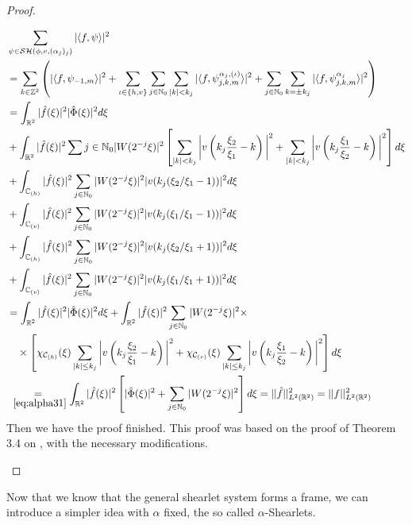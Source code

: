 \begin{proof}
\begin{itemize}
$$
\begin{aligned}
&\sum_{\psi\in\mathcal{SH}(\phi,v,(\alpha_j)_j)}|\langle f,\psi\rangle |^2\\
&=\sum_{k\in\mathbb{Z}^2}\left( |\langle f,\psi_{-1,m}\rangle|^2+\sum_{\iota\in\{h,v\}}\sum_{j\in\mathbb{N}_0}\sum_{|k|<k_j}|\langle f,\psi_{j,k,m}^{\alpha_j,(\iota)}\rangle|^2+\sum_{j\in\mathbb{N}_0}\sum_{k=\pm k_j}|\langle f,\psi_{j,k,m}^{\alpha_j}\rangle |^2 \right)\\
&=\int_{\mathbb{R}^2}|\hat{f}(\xi)|^2|\hat{\Phi}(\xi)|^2d\xi\\
&+\int_{\mathbb{R}^2}|\hat{f}(\xi)|^2\sum{j\in\mathbb{N}_0}|W(2^{-j}\xi)|^2\left[ \sum_{|k|<k_j}\bigg| v\left( k_j\frac{\xi_2}{\xi_1}-k\right)\bigg|^2+\sum_{|k|<k_j}\bigg| v\left(k_j\frac{\xi_1}{\xi_2}-k\right)\bigg|^2\right] d\xi\\
&+\int_{\mathbb{C}_{(h)}}|\hat{f}(\xi)|^2\sum_{j\in\mathbb{N}_0}|W(2^{-j}\xi)|^2|v(k_j(\xi_2/\xi_1-1))|^2d\xi\\
&+\int_{\mathbb{C}_{(v)}}|\hat{f}(\xi)|^2\sum_{j\in\mathbb{N}_0}|W(2^{-j}\xi)|^2|v(k_j(\xi_1/\xi_1-1))|^2d\xi\\
&+\int_{\mathbb{C}_{(h)}}|\hat{f}(\xi)|^2\sum_{j\in\mathbb{N}_0}|W(2^{-j}\xi)|^2|v(k_j(\xi_2/\xi_1+1))|^2d\xi\\
&+\int_{\mathbb{C}_{(v)}}|\hat{f}(\xi)|^2\sum_{j\in\mathbb{N}_0}|W(2^{-j}\xi)|^2|v(k_j(\xi_1/\xi_1+1))|^2d\xi\\
&=\int_{\mathbb{R}^2}|\hat{f}(\xi)|^2|\hat{\Phi}(\xi)|^2d\xi+\int_{\mathbb{R}^2}|\hat{f}(\xi)|^2\sum_{j\in\mathbb{N}_0}|W(2^{-j}\xi)|^2\times \\
&\quad \times \left[ \chi_{\mathcal{C}_{(h)}}(\xi)\sum_{|k|\leq k_j}\bigg| v\left( k_j\frac{\xi_2}{\xi_1}-k\right)\bigg|^2+\chi_{\mathcal{C}_{(v)}}(\xi)\sum_{|k|\leq k_j}\bigg| v\left( k_j\frac{\xi_1}{\xi_2}-k\right)\bigg|^2\right]d\xi\\
&\underset{~\ref{eq:alpha31}}{=}\int_{\mathbb{R}^2}|\hat{f}(\xi)|^2\left[|\hat{\Phi}(\xi)|^2+\sum_{j\in\mathbb{N}_0}|W(2^{-j}\xi)|^2\right]d\xi = ||\hat{f}||^2_{L^2(\mathbb{R}^2)}=||f||^2_{L^2(\mathbb{R}^2)}
\end{aligned}
$$
Then we have the proof finished. This proof was based on the proof of Theorem 3.4 on \cite{Gitta-alpha}, with the necessary modifications.
\end{itemize}
\end{proof}

\bigskip

Now that we know that the general shearlet system forms a frame, we can introduce a simpler idea with $\alpha$ fixed, the so called $\alpha$-Shearlets.

